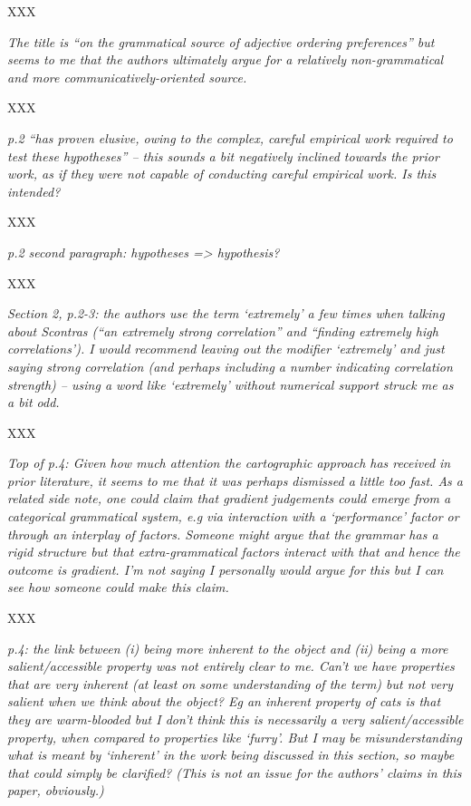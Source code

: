 \documentclass[12pt]{article}
\begin{document}
XXX

\item \emph{The title is ``on the grammatical source of adjective ordering
preferences'' but seems to me that the authors ultimately argue for a
relatively non-grammatical and more communicatively-oriented source.}

XXX

\item \emph{p.2 ``has proven elusive, owing to the complex, careful empirical work
required to test these hypotheses'' – this sounds a bit negatively
inclined towards the prior work, as if they were not capable of conducting
careful empirical work. Is this intended?}

XXX

\item \emph{p.2 second paragraph: hypotheses => hypothesis?}

XXX

\item \emph{Section 2, p.2-3: the authors use the term `extremely' a few times when
talking about Scontras (``an extremely strong correlation'' and ``finding
extremely high correlations').  I would recommend leaving out the modifier
`extremely' and just saying strong correlation (and perhaps including a
number indicating correlation strength) – using a word like
`extremely' without numerical support struck me as a bit odd.}

XXX

\item \emph{Top of p.4: Given how much attention the cartographic approach has received
in prior literature, it seems to me that it was perhaps dismissed a little
too fast. As a related side note, one could claim that gradient judgements
could emerge from a categorical grammatical system, e.g via interaction with
a `performance' factor or through an interplay of factors. Someone might
argue that the grammar has a rigid structure but that extra-grammatical
factors interact with that and hence the outcome is gradient. I'm not
saying I personally would argue for this but I can see how someone could
make this claim.}

XXX

\item \emph{p.4: the link between (i) being more inherent to the object and (ii) being a
more salient/accessible property was not entirely clear to me.  Can't we
have properties that are very inherent (at least on some understanding of
the term) but not very salient when we think about the object? Eg an
inherent property of cats is that they are warm-blooded but I don't think
this is necessarily a very salient/accessible property, when compared to
properties like `furry'. But I may be misunderstanding what is meant by
`inherent' in the work being discussed in this section, so maybe that
could simply be clarified?  (This is not an issue for the authors' claims
in this paper, obviously.)}
\end{document}
